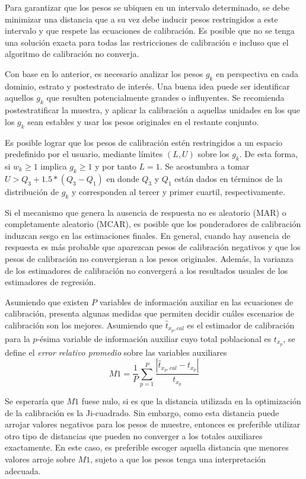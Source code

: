 \documentclass[
  12pt,
  spanish,
]{book}
\begin{document}
Para garantizar que los pesos se ubiquen en un intervalo determinado, se debe minimizar una distancia que a su vez debe inducir pesos restringidos a este intervalo y que respete las ecuaciones de calibración. Es posible que no se tenga una solución exacta para todas las restricciones de calibración e incluso que el algoritmo de calibración no converja.

Con base en lo anterior, es necesario analizar los pesos \(g_k\) en perspectiva en cada dominio, estrato y postestrato de interés. Una buena idea puede ser identificar aquellos \(g_k\) que resulten potencialmente grandes o influyentes. Se recomienda postestratificar la muestra, y aplicar la calibración a aquellas unidades en los que los \(g_k\) sean estables y usar los pesos originales en el restante conjunto.

Es posible lograr que los pesos de calibración estén restringidos a un espacio predefinido por el usuario, mediante límites \((L, U)\) sobre los \(g_k\). De esta forma, si \(w_k \geq 1\) implica \(g_k \geq 1\) y por tanto \(L=1\). Se acostumbra a tomar \(U > Q_3 + 1.5 * (Q_3 - Q_1)\) en donde \(Q_3\) y \(Q_1\) están dados en términos de la distribución de \(g_k\) y corresponden al tercer y primer cuartil, respectivamente.

Si el mecanismo que genera la ausencia de respuesta no es aleatorio (MAR) o completamente aleatorio (MCAR), es posible que los ponderadores de calibración induzcan sesgo en las estimaciones finales. En general, cuando hay ausencia de respuesta es más probable que aparezcan pesos de calibración negativos y que los pesos de calibración no convergieran a los pesos originales. Además, la varianza de los estimadores de calibración no convergerá a los resultados usuales de los estimadores de regresión.

Asumiendo que existen \(P\) variables de información auxiliar en las ecuaciones de calibración, \citet{Silva_2004} presenta algunas medidas que permiten decidir cuáles escenarios de calibración son los mejores. Asumiendo que \(\hat{t}_{x_p, cal}\) es el estimador de calibración para la \(p\)-ésima variable de información auxiliar cuyo total poblacional es \(t_{x_p}\), se define el \emph{error relativo promedio} sobre las variables auxiliares
\[
M1= \frac{1}{P} \sum_{p=1}^P \frac{|\hat{t}_{x_p, cal} - t_{x_p}|}{t_{x_p}}
\]

Se esperaría que \(M1\) fuese nulo, si es que la distancia utilizada en la optimización de la calibración es la Ji-cuadrado. Sin embargo, como esta distancia puede arrojar valores negativos para los pesos de muestre, entonces es preferible utilizar otro tipo de distancias que pueden no converger a los totales auxiliares exactamente. En este caso, es preferible escoger aquella distancia que menores valores arroje sobre \(M1\), sujeto a que los pesos tenga una interpretación adecuada.
\end{document}
